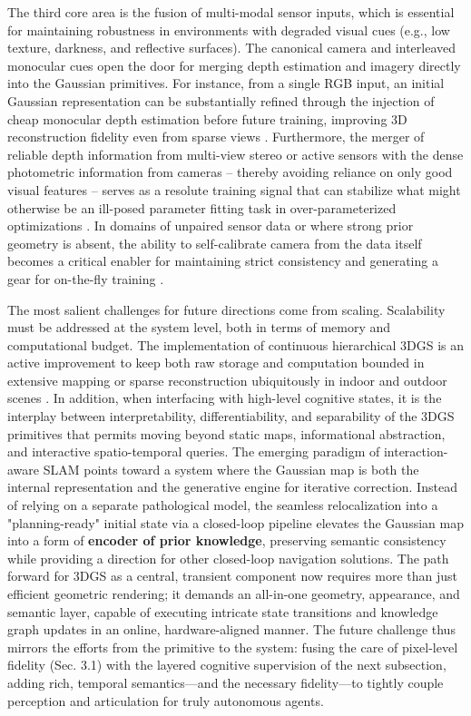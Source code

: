 \documentclass[11pt,a4paper]{article}
\begin{document}
The third core area is the fusion of multi-modal sensor inputs, which is essential for maintaining robustness in environments with degraded visual cues (e.g., low texture, darkness, and reflective surfaces). The canonical camera and interleaved monocular cues open the door for merging depth estimation and imagery directly into the Gaussian primitives. For instance, from a single RGB input, an initial Gaussian representation can be substantially refined through the injection of cheap monocular depth estimation before future training, improving 3D reconstruction fidelity even from sparse views \cite{arxiv:2505.15185v1}. Furthermore, the merger of reliable depth information from multi-view stereo or active sensors with the dense photometric information from cameras -- thereby avoiding reliance on only good visual features -- serves as a resolute training signal that can stabilize what might otherwise be an ill-posed parameter fitting task in over-parameterized optimizations \cite{arxiv:2411.03637v1,arxiv:2504.20378v1}. In domains of unpaired sensor data or where strong prior geometry is absent, the ability to self-calibrate camera from the data itself becomes a critical enabler for maintaining strict consistency and generating a gear for on-the-fly training \cite{arxiv:2403.14627v1}.

The most salient challenges for future directions come from scaling. Scalability must be addressed at the system level, both in terms of memory and computational budget. The implementation of continuous hierarchical 3DGS is an active improvement to keep both raw storage and computation bounded in extensive mapping or sparse reconstruction ubiquitously in indoor and outdoor scenes \cite{arxiv:2410.06245v1}. In addition, when interfacing with high-level cognitive states, it is the interplay between interpretability, differentiability, and separability of the 3DGS primitives that permits moving beyond static maps, informational abstraction, and interactive spatio-temporal queries. The emerging paradigm of interaction-aware SLAM points toward a system where the Gaussian map is both the internal representation and the generative engine for iterative correction. Instead of relying on a separate pathological model, the seamless relocalization into a "planning-ready" initial state via a closed-loop pipeline elevates the Gaussian map into a form of \textbf{encoder of prior knowledge}, preserving semantic consistency while providing a direction for other closed-loop navigation solutions. The path forward for 3DGS as a central, transient component now requires more than just efficient geometric rendering; it demands an all-in-one geometry, appearance, and semantic layer, capable of executing intricate state transitions and knowledge graph updates in an online, hardware-aligned manner. The future challenge thus mirrors the efforts from the primitive to the system: fusing the care of pixel-level fidelity (Sec. 3.1) with the layered cognitive supervision of the next subsection, adding rich, temporal semantics---and the necessary fidelity---to tightly couple perception and articulation for truly autonomous agents.
\end{document}
